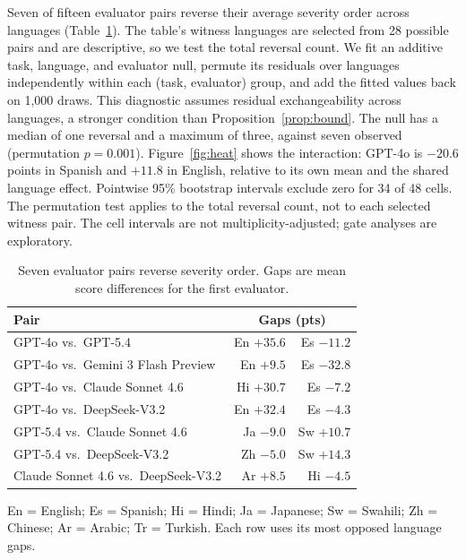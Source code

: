 \documentclass[sigconf,anonymous]{aamas}
\begin{document}
Seven of fifteen evaluator pairs reverse their average severity order
across languages (Table~\ref{tab:rev}). The table's witness languages are selected from 28
possible pairs and are descriptive, so we test the total reversal count.
We fit an additive task, language, and evaluator null, permute its residuals
over languages independently within each (task, evaluator) group,
and add the fitted values back on 1{,}000 draws. This diagnostic assumes
residual exchangeability across languages, a stronger condition than
Proposition~\ref{prop:bound}. The
null has a median of one reversal and a maximum of three, against seven
observed (permutation $p=0.001$). Figure~\ref{fig:heat} shows the interaction:
GPT-4o is $-20.6$ points in Spanish and $+11.8$ in English, relative to its
own mean and the shared language effect. Pointwise 95\% bootstrap intervals exclude zero
for 34 of 48 cells. The permutation test applies to the total reversal
count, not to each selected witness pair. The cell intervals are not
multiplicity-adjusted; gate analyses are exploratory.

\begin{table}[t]\centering\small
\setlength{\tabcolsep}{3pt}
\caption{Seven evaluator pairs reverse severity order. Gaps are mean
score differences for the first evaluator.}
\label{tab:rev}
\begin{tabular*}{\columnwidth}{@{\extracolsep{\fill}}lrr@{}}
\toprule
\textbf{Pair} & \multicolumn{2}{c}{\textbf{Gaps (pts)}}\\
\midrule
GPT-4o vs.\ GPT-5.4 & En $+35.6$ & Es $-11.2$\\
GPT-4o vs.\ Gemini 3 Flash Preview & En $+9.5$ & Es $-32.8$\\
GPT-4o vs.\ Claude Sonnet 4.6 & Hi $+30.7$ & Es $-7.2$\\
GPT-4o vs.\ DeepSeek-V3.2 & En $+32.4$ & Es $-4.3$\\
GPT-5.4 vs.\ Claude Sonnet 4.6 & Ja $-9.0$ & Sw $+10.7$\\
GPT-5.4 vs.\ DeepSeek-V3.2 & Zh $-5.0$ & Sw $+14.3$\\
Claude Sonnet 4.6 vs.\ DeepSeek-V3.2 & Ar $+8.5$ & Hi $-4.5$\\
\bottomrule
\end{tabular*}
\par\smallskip\parbox{\columnwidth}{\footnotesize En = English; Es = Spanish;
Hi = Hindi; Ja = Japanese; Sw = Swahili; Zh = Chinese; Ar = Arabic; Tr = Turkish.
Each row uses its most opposed language gaps.}
\end{table}
\end{document}
